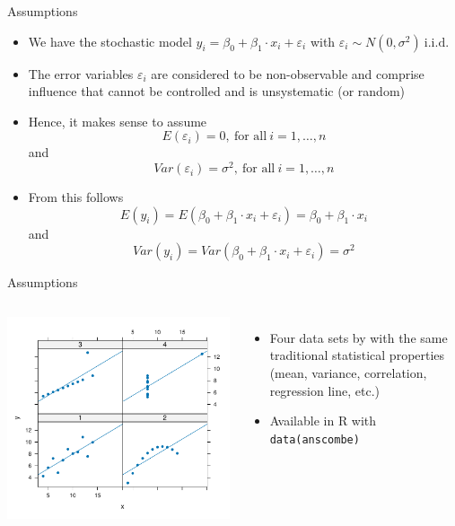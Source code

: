 \documentclass[aspectratio=169]{beamer}
\begin{document}
\begin{frame}{Assumptions}
  \begin{itemize}
    \item We have the stochastic model $y_i = \beta_0 + \beta_1 \cdot x_i +
      \varepsilon_i$ with $\varepsilon_i \sim N(0, \sigma^2)~\text{i.i.d.}$
    \item The error variables $\varepsilon_i$ are considered to be
      non-observable and comprise influence that cannot be controlled and is
      unsystematic (or random)
    \item Hence, it makes sense to assume
    \[
      E(\varepsilon_i) = 0, ~\text{for all}~ i = 1, \ldots, n
    \]
    and
    \[
      Var(\varepsilon_i) = \sigma^2, ~\text{for all}~ i = 1, \ldots, n
    \]
  \item From this follows
\[
  E(y_i) = E(\beta_0 + \beta_1 \cdot x_i + \varepsilon_i) =
  \beta_0 + \beta_1 \cdot x_i
\]
and
\[
  Var(y_i) = Var(\beta_0 + \beta_1 \cdot x_i + \varepsilon_i) = \sigma^2
\]
  \end{itemize}
\end{frame}

\begin{frame}{Assumptions}
  \begin{columns}
    \includegraphics[scale=.6]{../figures/anscombe} 
  \begin{itemize}
    \item Four data sets by \citet{Anscombe1973} with the same traditional
      statistical properties (mean, variance, correlation, regression line,
      etc.)
    \item Available in R with \texttt{data(anscombe)}
  \end{itemize}
  \end{columns}
\end{frame}
\end{document}
